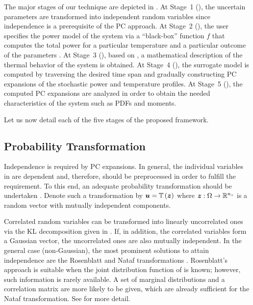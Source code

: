 The major stages of our technique are depicted in . At
Stage~1 (), the uncertain parameters \vu
are transformed into independent random variables \vz since independence is a
prerequisite of the \ac{PC} approach. At Stage~2 (), the
user specifies the power model of the system via a ``black-box'' function $f$
that computes the total power \vp for a particular temperature \vq and a
particular outcome of the parameters \vu. At Stage~3
(), based on , a
mathematical description of the thermal behavior of the system is obtained. At
Stage~4 (), the surrogate model is computed by
traversing the desired time span and gradually constructing \ac{PC} expansions
of the stochastic power and temperature profiles. At Stage~5
(), the computed \ac{PC} expansions are analyzed in
order to obtain the needed characteristics of the system such as \acp{PDF} and
moments.

Let us now detail each of the five stages of the proposed framework.

\subsection{Probability Transformation}

Independence is required by \ac{PC} expansions. In general, the \nu individual
variables in \vu are dependent and, therefore, should be preprocessed in order
to fulfill the requirement. To this end, an adequate probability transformation
should be undertaken \cite{eldred2008}. Denote such a transformation by $\vu =
\transform{\vz}$ where $\boldsymbol{z}: \Omega \to \mathbb{R}^{n_{z}}$ is a random vector with \nz
mutually independent components.

Correlated random variables can be transformed into linearly uncorrelated ones
via the \ac{KL} decomposition given in . If, in addition,
the correlated variables form a Gaussian vector, the uncorrelated ones are also
mutually independent. In the general case (non-Gaussian), the most prominent
solutions to attain independence are the Rosenblatt \cite{rosenblatt1952} and
Nataf transformations \cite{liu1986}. Rosenblatt's approach is suitable when the
joint distribution function of \vu is known; however, such information is rarely
available. A set of marginal distributions and a correlation matrix are more
likely to be given, which are already sufficient for the Nataf transformation.
See  for more detail.

